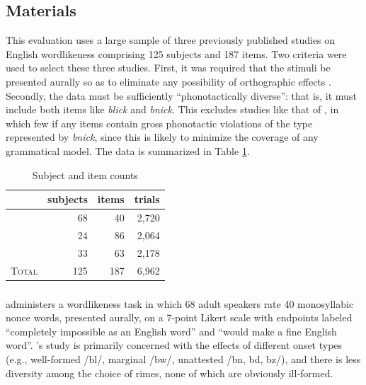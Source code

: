 \subsection{Materials}

This evaluation uses a large sample of three previously published studies on English wordlikeness comprising 125 subjects and 187 items. Two criteria were used to select these three studies. First, it was required that the stimuli be presented aurally so as to eliminate any possibility of orthographic effects \citep[e.g.,][]{Berent2001b,Berent2008b}. Secondly, the data must be sufficiently ``phonotactically diverse'': that is, it must include both items like \emph{blick} and \emph{bnick}. This excludes studies like that of \citet{Bailey2001}, in which few if any items contain gross phonotactic violations of the type represented by \emph{bnick}, since this is likely to minimize the coverage of any grammatical model. The data is summarized in Table \ref{counts}.

\begin{table}[ht]
\centering
\begin{tabular}{l rrr}
\toprule
                           & subjects & items & trials \\
\midrule
\citeauthor{Albright2007}  & 68       & 40    & 2,720  \\
\citeauthor{Albright2003b} & 24       & 86    & 2,064  \\
\citeauthor{Scholes1966}   & 33       & 63    & 2,178  \\
\midrule
\textsc{Total}             & 125      & 187   & 6,962  \\
\bottomrule
\end{tabular}
\caption{Subject and item counts}
\label{counts}
\end{table}

\subsubsection{\citealt{Albright2007}}

\citet{Albright2007} administers a wordlikeness task in which 68 adult speakers rate 40 monosyllabic nonce words, presented aurally, on a 7-point Likert scale with endpoints labeled  ``completely impossible as an English word'' and ``would make a fine English word''. \citeauthor{Albright2007}'s study is primarily concerned with the effects of different onset types (e.g., well-formed /bl/, marginal /bw/, unattested /bn, bd, bz/), and there is less diversity among the choice of rimes, none of which are obviously ill-formed.

